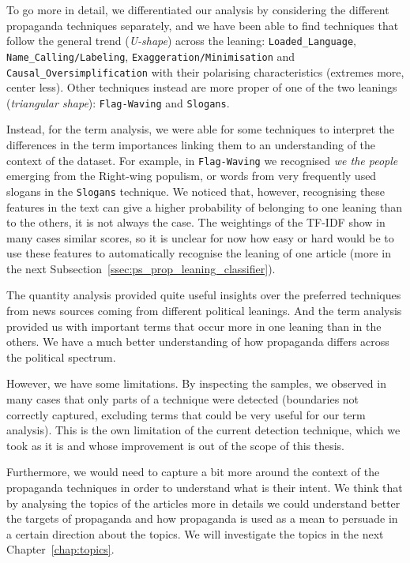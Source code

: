 To go more in detail, we differentiated our analysis by considering the different propaganda techniques separately, and we have been able to find techniques that follow the general trend (\emph{U-shape}) across the leaning: \texttt{Loaded\_Language}, \texttt{Name\_Calling/Labeling}, \texttt{Exaggeration/Minimisation} and \texttt{Causal\_Oversimplification} with their polarising characteristics (extremes more, center less). Other techniques instead are more proper of one of the two leanings (\emph{triangular shape}): \texttt{Flag-Waving} and \texttt{Slogans}. 


Instead, for the term analysis, we were able for some techniques to interpret the differences in the term importances linking them to an understanding of the context of the dataset. For example, in \texttt{Flag-Waving} we recognised \textit{we the people} emerging from the Right-wing populism, or words from very frequently used slogans in the \texttt{Slogans} technique.
We noticed that, however, recognising these features in the text can give a higher probability of belonging to one leaning than to the others, it is not always the case. The weightings of the TF-IDF show in many cases similar scores, so it is unclear for now how easy or hard would be to use these features to automatically recognise the leaning of one article (more in the next Subsection~\ref{ssec:ps_prop_leaning_classifier}).

The quantity analysis provided quite useful insights over the preferred techniques from news sources coming from different political leanings. And the term analysis provided us with important terms that occur more in one leaning than in the others.
We have a much better understanding of how propaganda differs across the political spectrum.

However, we have some limitations. By inspecting the samples, we observed in many cases that only parts of a technique were detected (boundaries not correctly captured, excluding terms that could be very useful for our term analysis).
This is the own limitation of the current detection technique, which we took as it is and whose improvement is out of the scope of this thesis.

Furthermore, we would need to capture a bit more around the context of the propaganda techniques in order to understand what is their intent. We think that by analysing the topics of the articles more in details we could understand better the targets of propaganda and how propaganda is used as a mean to persuade in a certain direction about the topics. We will investigate the topics in the next Chapter~\ref{chap:topics}.

